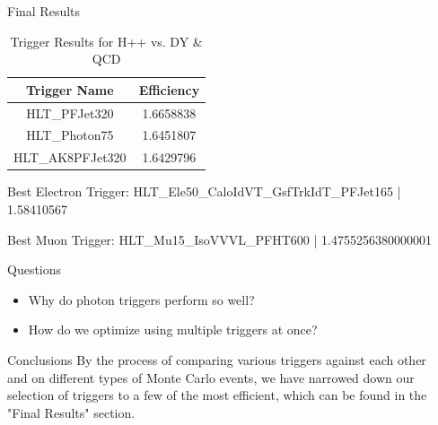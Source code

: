 \documentclass{beamer}
\newlength{\sepwidth}
\newlength{\colwidth}
\newcommand{\separatorcolumn}{\begin{column}{\sepwidth}\end{column}}
\begin{document}
\begin{frame}[t]
\begin{columns}[t]
\begin{column}{\colwidth}
\begin{block}{Final Results}
    \begin{table}[h!]
      \caption{\label{table:6}Trigger Results for H++ vs. DY \& QCD}
          \begin{tabular}[t]{c|c}
              \hline
              \textbf{Trigger Name} & \textbf{Efficiency}\\
              \hline
              HLT\_PFJet320 & 1.6658838 \\
              HLT\_Photon75 & 1.6451807 \\
              HLT\_AK8PFJet320 & 1.6429796
          \end{tabular}
  \end{table}
  Best Electron Trigger: HLT\_Ele50\_CaloIdVT\_GsfTrkIdT\_PFJet165 | 1.58410567

  Best Muon Trigger: HLT\_Mu15\_IsoVVVL\_PFHT600 | 1.4755256380000001
  \end{block}

  \begin{block}{Questions}
    \begin{itemize}
      \item Why do photon triggers perform so well?
      \item How do we optimize using multiple triggers at once?
    \end{itemize}
  \end{block}
  \begin{block}{Conclusions}
    By the process of comparing various triggers against each other and on different types of Monte Carlo events, we have narrowed down our selection of triggers to a few of the most efficient, which can be found in the "Final Results" section. 
  \end{block}





\end{column}

\separatorcolumn
\end{columns}
\end{frame}
\end{document}
